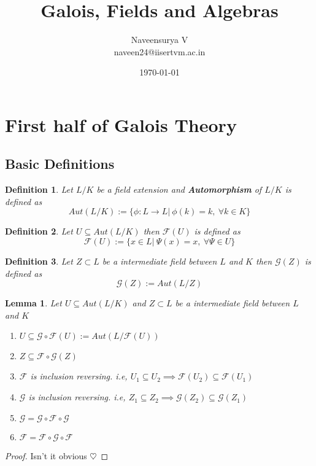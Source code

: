 \documentclass[10pt, oneside]{article}
\title{Galois, Fields and Algebras}
\author{Naveensurya V \\ naveen24@iisertvm.ac.in}
\date{\today}
\newcommand{\G}{\mathcal{G}}
\newcommand{\F}{\mathcal{F}}
\newtheorem{defn}{Definition}[section]
\newtheorem{lem}{Lemma}[section]
\begin{document}
	

	
	\maketitle
	\tableofcontents
	
	\vspace{.25in}
	\pagebreak
	\section{First half of Galois Theory}
	
	\subsection{Basic Definitions}
	\begin{defn}
		Let $L / K$ be a field extension and \textbf{Automorphism} of $L/K$ is defined as \[Aut(L/K) := \{\phi : L \to L | \ \phi (k) = k , \ \forall k \in K \}\]
	\end{defn}

	\begin{defn}
		Let $U \subseteq Aut(L/K)$ then $\mathcal{F}(U)$ is defined as \[\mathcal{F}(U) := \{x \in L | \ \Psi (x)= x , \ \forall \Psi \in U\}\]
		
	\end{defn}
\begin{defn}
	Let $Z \subset L$ be a intermediate field between $L$ and $K$ then $\mathcal{G}(Z)$ is defined as
	\[ \mathcal{G}(Z) := Aut(L/Z) \]
\end{defn}

\begin{lem}
	Let $U \subseteq Aut(L/K)$ and $Z \subset L$ be a intermediate field between $L$ and $K$
	\begin{enumerate}
		\item[(a)] $U \subseteq \G \circ \F (U) := Aut(L/ \F(U))$
		\item[(b)] $Z \subseteq \F \circ \G (Z) $
		\item[(c)] $\F$ is inclusion reversing. i.e, $U_1 \subseteq U_2 \implies \F(U_2) \subseteq \F(U_1)$ 
		\item[(d)] $\G$ is inclusion reversing. i.e, $Z_1 \subseteq Z_2 \implies \G(Z_2) \subseteq \G(Z_1)$   
		\item[(e)] $\G = \G \circ \F \circ \G$
		\item[(f)] $\F = \F \circ \G \circ \F$   
	\end{enumerate}
\end{lem}
\begin{proof}
	Isn't it obvious $\heartsuit $
\end{proof}
\end{document}
